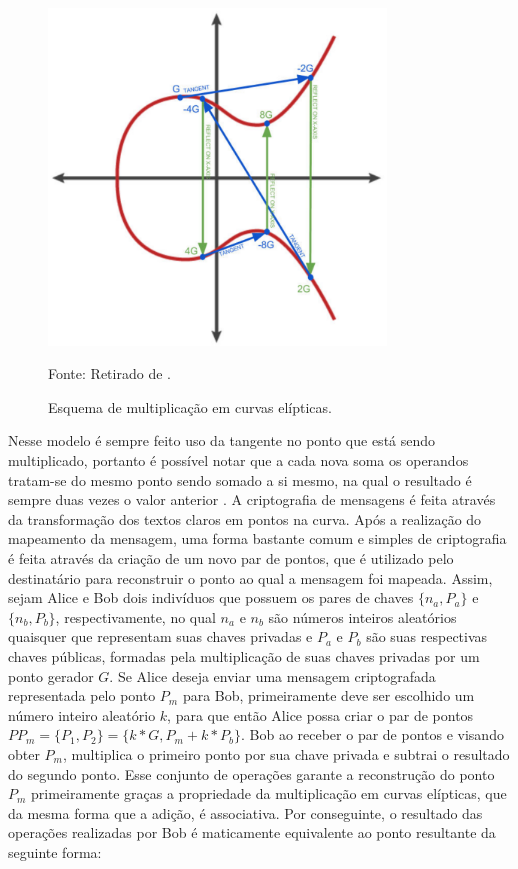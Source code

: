 \begin{figure}[ht]
\caption{Esquema de multiplicação em curvas elípticas.}
\centering
\includegraphics[width=0.8\textwidth]{imagens/ecc.png}
\begin{center}
        Fonte: Retirado de \cite{blockchain:mastering_bitcoin}.
\end{center}
\label{fig:mult_ecc}
\end{figure}

Nesse modelo é sempre feito uso da tangente no ponto que está sendo multiplicado, portanto é possível notar que a cada nova soma os operandos tratam-se do mesmo ponto sendo somado a si mesmo, na qual o resultado é sempre duas vezes o valor anterior \cite{blockchain:mastering_bitcoin}. A criptografia de mensagens é feita através da transformação dos textos claros em pontos na curva. Após a realização do mapeamento da mensagem, uma forma bastante comum e simples de criptografia é feita através da criação de um novo par de pontos, que é utilizado pelo destinatário para reconstruir o ponto ao qual a mensagem foi mapeada. Assim, sejam Alice e Bob dois indivíduos que possuem os pares de chaves $\{n_a, P_a\}$ e $\{n_b, P_b\}$, respectivamente, no qual $n_a$ e $n_b$ são números inteiros aleatórios quaisquer que representam suas chaves privadas e $P_a$ e $P_b$ são suas respectivas chaves públicas, formadas pela multiplicação de suas chaves privadas por um ponto gerador $G$. Se Alice deseja enviar uma mensagem criptografada representada pelo ponto $P_m$ para Bob, primeiramente deve ser escolhido um número inteiro aleatório $k$, para que então Alice possa criar o par de pontos $PP_m = \{P_1, P_2\} = \{k*G, P_m + k*P_b\}$. Bob ao receber o par de pontos e visando obter $P_m$, multiplica o primeiro ponto por sua chave privada e subtrai o resultado do segundo ponto. Esse conjunto de operações garante a reconstrução do ponto $P_m$ primeiramente graças a propriedade da multiplicação em curvas elípticas, que da mesma forma que a adição, é associativa. Por conseguinte, o resultado das operações realizadas por Bob é maticamente equivalente ao ponto resultante da seguinte forma:

